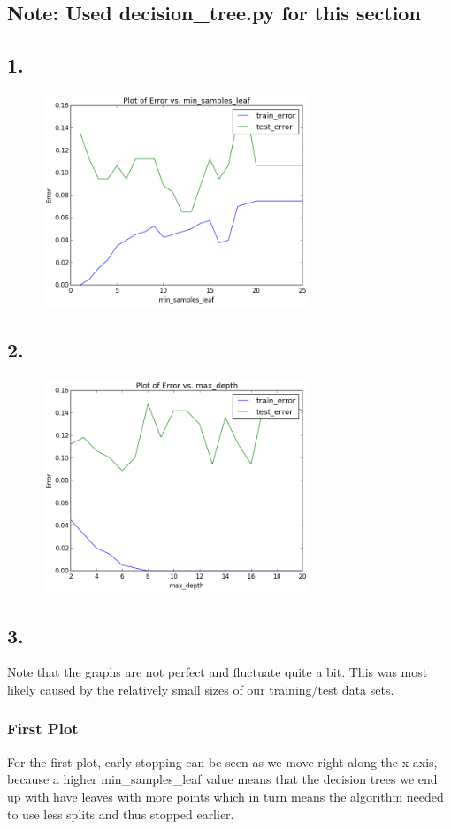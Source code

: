 \documentclass{article}
\begin{document}
\subsection*{Note: Used decision\_tree.py for this section}
\subsection*{1.}
\begin{figure}[h]
\includegraphics[width=8cm]{min_samples_leaves}
\end{figure}

\subsection*{2.}
\begin{figure}[h]
\includegraphics[width=8cm]{max_depths}
\end{figure}

\subsection*{3.}
Note that the graphs are not perfect and fluctuate quite a bit. This was most likely
caused by the relatively small sizes of our training/test data sets.

\subsubsection*{First Plot}
For the first plot, early stopping can be seen as we move right along the x-axis,
because a higher min\_samples\_leaf value means that the decision trees we end up with
have leaves with more points which in turn means the algorithm needed to use less splits
and thus stopped earlier.
\end{document}
